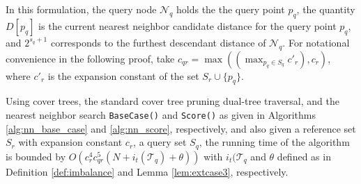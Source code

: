 In this formulation, the query node $\mathscr{N}_q$ holds the the query point
$p_q$, the quantity $D[p_q]$ is the current nearest neighbor candidate distance
for the query point $p_q$, and $2^{s_q + 1}$ corresponds to the furthest
descendant distance of $\mathscr{N}_q$.  For notational convenience in the
following proof, take $c_{qr} = \max((\max_{p_q \in S_q} c'_r), c_r)$, where
$c'_r$ is the expansion constant of the set $S_r \cup \{ p_q \}$.



\begin{thm}
Using cover trees, the standard cover tree pruning dual-tree traversal, and the
nearest neighbor search \texttt{BaseCase()} and \texttt{Score()} as given in
Algorithms \ref{alg:nn_base_case} and \ref{alg:nn_score}, respectively, and also
given a reference set $S_r$ with expansion constant $c_r$, a query set $S_q$,
the running time of the algorithm is bounded by $O(c_r^4 c_{qr}^5 (N +
i_t(\mathscr{T}_q) + \theta))$ with $i_t(\mathscr{T}_q$ and $\theta$ defined as
in Definition \ref{def:imbalance} and Lemma \ref{lem:extcase3}, respectively.
\label{thm:nns}
\end{thm}

